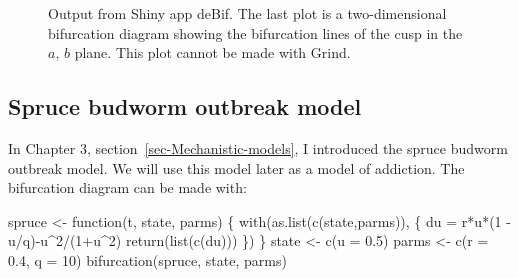 \documentclass[
  a4paper,
  DIV=11,
  numbers=noendperiod,
  oneside]{scrreprt}
\newenvironment{Shaded}{}{}
\newcommand{\AttributeTok}[1]{\textcolor[rgb]{0.84,0.23,0.29}{#1}}
\newcommand{\ControlFlowTok}[1]{\textcolor[rgb]{0.84,0.23,0.29}{#1}}
\newcommand{\DecValTok}[1]{\textcolor[rgb]{0.00,0.36,0.77}{#1}}
\newcommand{\FloatTok}[1]{\textcolor[rgb]{0.00,0.36,0.77}{#1}}
\newcommand{\FunctionTok}[1]{\textcolor[rgb]{0.44,0.26,0.76}{#1}}
\newcommand{\NormalTok}[1]{\textcolor[rgb]{0.14,0.16,0.18}{#1}}
\newcommand{\OtherTok}[1]{\textcolor[rgb]{0.44,0.26,0.76}{#1}}
\newcommand{\SpecialCharTok}[1]{\textcolor[rgb]{0.00,0.36,0.77}{#1}}
\begin{document}
\begin{figure}


\caption{\label{fig-ch4n-img4-old-52}Output from Shiny app deBif. The
last plot is a two-dimensional bifurcation diagram showing the
bifurcation lines of the cusp in the \(a\), \(b\) plane. This plot
cannot be made with Grind.}

\end{figure}%

\subsection{Spruce budworm outbreak
model}\label{sec-Spruce-Budworm-outbreak-model}

In Chapter 3, section~\ref{sec-Mechanistic-models}, I introduced the
spruce budworm outbreak model. We will use this model later as a model
of addiction. The bifurcation diagram can be made with:

\begin{Shaded}
\begin{Highlighting}[]
\NormalTok{spruce }\OtherTok{\textless{}{-}} \ControlFlowTok{function}\NormalTok{(t, state, parms) \{}
  \FunctionTok{with}\NormalTok{(}\FunctionTok{as.list}\NormalTok{(}\FunctionTok{c}\NormalTok{(state,parms)), \{}
\NormalTok{    du }\OtherTok{=}\NormalTok{ r}\SpecialCharTok{*}\NormalTok{u}\SpecialCharTok{*}\NormalTok{(}\DecValTok{1} \SpecialCharTok{{-}}\NormalTok{ u}\SpecialCharTok{/}\NormalTok{q)}\SpecialCharTok{{-}}\NormalTok{u}\SpecialCharTok{\^{}}\DecValTok{2}\SpecialCharTok{/}\NormalTok{(}\DecValTok{1}\SpecialCharTok{+}\NormalTok{u}\SpecialCharTok{\^{}}\DecValTok{2}\NormalTok{)}
    \FunctionTok{return}\NormalTok{(}\FunctionTok{list}\NormalTok{(}\FunctionTok{c}\NormalTok{(du)))}
\NormalTok{  \})}
\NormalTok{\}}
\NormalTok{state }\OtherTok{\textless{}{-}} \FunctionTok{c}\NormalTok{(}\AttributeTok{u =} \FloatTok{0.5}\NormalTok{)}
\NormalTok{parms }\OtherTok{\textless{}{-}} \FunctionTok{c}\NormalTok{(}\AttributeTok{r =} \FloatTok{0.4}\NormalTok{, }\AttributeTok{q =} \DecValTok{10}\NormalTok{)}
\FunctionTok{bifurcation}\NormalTok{(spruce, state, parms)}
\end{Highlighting}
\end{Shaded}
\end{document}
